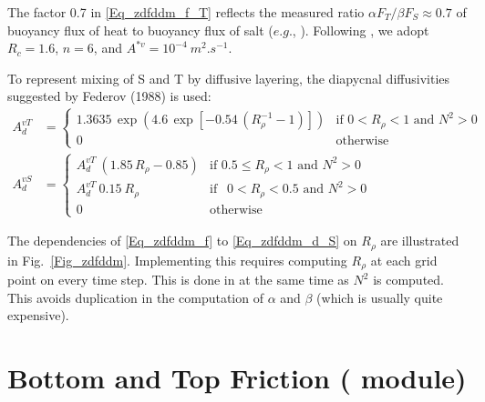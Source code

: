 \documentclass[NEMO_book]{subfiles}
\begin{document}
The factor 0.7 in \eqref{Eq_zdfddm_f_T} reflects the measured ratio 
$\alpha F_T /\beta F_S \approx  0.7$ of buoyancy flux of heat to buoyancy 
flux of salt ($e.g.$, \citet{McDougall_Taylor_JMR84}). Following  \citet{Merryfield1999}, 
we adopt $R_c = 1.6$, $n = 6$, and $A^{\ast v} = 10^{-4}~m^2.s^{-1}$.

To represent mixing of S and T by diffusive layering,  the diapycnal diffusivities suggested by Federov (1988) is used: 
\begin{align} 	\label{Eq_zdfddm_d}
A_d^{vT} &= 	\begin{cases}
	1.3635 \, \exp{\left( 4.6\, \exp{ \left[  -0.54\,( R_{\rho}^{-1} - 1 )  \right] }    \right)}
									&\text{if  $0<R_\rho < 1$ and $N^2>0$ } \\
	0 								&\text{otherwise} 
				\end{cases}   
\\   			\label{Eq_zdfddm_d_S}
A_d^{vS} &= 	\begin{cases}
	A_d^{vT}\ \left( 1.85\,R_{\rho} - 0.85 \right)
									&\text{if  $0.5 \leq R_\rho<1$ and $N^2>0$ } \\
	A_d^{vT} \ 0.15 \ R_\rho
									&\text{if  $\ \ 0 < R_\rho<0.5$ and $N^2>0$ } \\
	0 								&\text{otherwise} 
				\end{cases}   
\end{align}

The dependencies of \eqref{Eq_zdfddm_f} to \eqref{Eq_zdfddm_d_S} on $R_\rho$ 
are illustrated in Fig.~\ref{Fig_zdfddm}. Implementing this requires computing 
$R_\rho$ at each grid point on every time step. This is done in  at the 
same time as $N^2$ is computed. This avoids duplication in the computation of 
$\alpha$ and $\beta$ (which is usually quite expensive).

\section  [Bottom and Top Friction (\textit{zdfbfr})]   {Bottom and Top Friction ( module)}
\label{ZDF_bfr}

\end{document}
